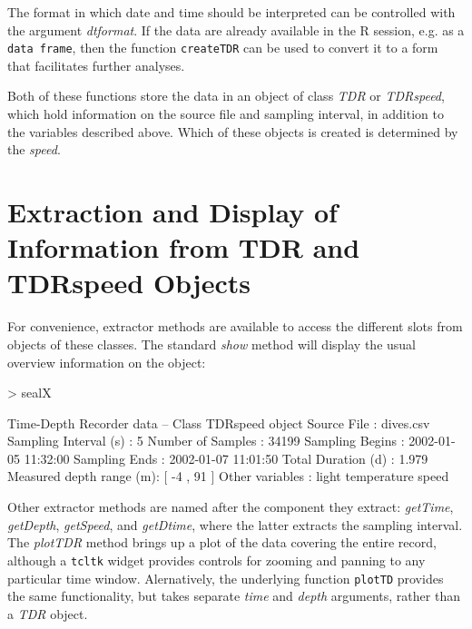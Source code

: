 \documentclass[12pt, letterpaper]{scrartcl}
\newcommand{\Robject}[1]{{\texttt{#1}}}
\newcommand{\Rfunction}[1]{{\texttt{#1}}}
\newcommand{\Rpackage}[1]{{\texttt{#1}}}
\newcommand{\Rclass}[1]{{\textit{#1}}}
\newcommand{\Rmethod}[1]{{\textit{#1}}}
\newcommand{\Rfunarg}[1]{{\textit{#1}}}
\newcommand{\R}{{\normalfont\textsf{R }}{}}
\begin{document}
The format in which date and time should be interpreted can be controlled
with the argument \Rfunarg{dtformat}.  If the data are already available
in the \R{} session, e.g. as a \Robject{data frame}, then the function
\Rfunction{createTDR} can be used to convert it to a form that facilitates
further analyses.

Both of these functions store the data in an object of class \Rclass{TDR}
or \Rclass{TDRspeed}, which hold information on the source file and
sampling interval, in addition to the variables described above.  Which of
these objects is created is determined by the \Rfunarg{speed}.


\section{Extraction and Display of Information from TDR and TDRspeed
  Objects}
\label{sec:extract}

For convenience, extractor methods are available to access the different
slots from objects of these classes.  The standard \Rmethod{show} method
will display the usual overview information on the object:
\begin{Schunk}
\begin{Sinput}
> sealX
\end{Sinput}
\begin{Soutput}
Time-Depth Recorder data -- Class TDRspeed object
  Source File             : dives.csv 
  Sampling Interval (s)   : 5 
  Number of Samples       : 34199 
  Sampling Begins         : 2002-01-05 11:32:00 
  Sampling Ends           : 2002-01-07 11:01:50 
  Total Duration (d)      : 1.979 
  Measured depth range (m): [ -4 , 91 ]
  Other variables         : light temperature speed 
\end{Soutput}
\end{Schunk}

Other extractor methods are named after the component they extract:
\Rmethod{getTime}, \Rmethod{getDepth}, \Rmethod{getSpeed}, and
\Rmethod{getDtime}, where the latter extracts the sampling interval.  The
\Rmethod{plotTDR} method brings up a plot of the data covering the entire
record, although a \Rpackage{tcltk} widget provides controls for zooming
and panning to any particular time window.  Alernatively, the underlying
function \Rfunction{plotTD} provides the same functionality, but takes
separate \Rfunarg{time} and \Rfunarg{depth} arguments, rather than a
\Rclass{TDR} object.
\end{document}
